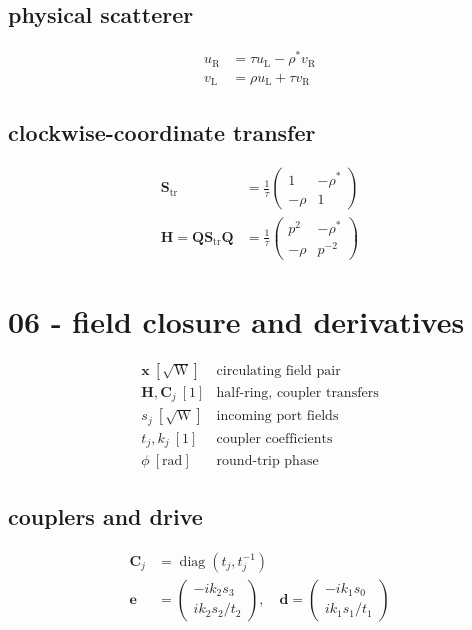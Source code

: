 \subsection*{physical scatterer}
\[
\displaystyle \begin{aligned}u_{\mathrm R}&=\tau u_{\mathrm L}-\rho^*v_{\mathrm R}\\v_{\mathrm L}&=\rho u_{\mathrm L}+\tau v_{\mathrm R}\end{aligned}
\]

\subsection*{clockwise-coordinate transfer}
\[
\displaystyle \begin{aligned}\mathbf S_{\mathrm{tr}}&=\frac1\tau\begin{pmatrix}1&-\rho^*\\-\rho&1\end{pmatrix}\\\mathbf H=\mathbf Q\mathbf S_{\mathrm{tr}}\mathbf Q&=\frac1\tau\begin{pmatrix}p^2&-\rho^*\\-\rho&p^{-2}\end{pmatrix}\end{aligned}
\]

\clearpage
\section*{06 - field closure and derivatives}

\[
\begin{array}{ll}\mathbf x\ [\sqrt{\mathrm W}]&\text{circulating field pair}\\[0.6em]\mathbf H,\mathbf C_j\ [1]&\text{half-ring, coupler transfers}\\[0.6em]s_j\ [\sqrt{\mathrm W}]&\text{incoming port fields}\\[0.6em]t_j,k_j\ [1]&\text{coupler coefficients}\\[0.6em]\phi\ [\mathrm{rad}]&\text{round-trip phase}\end{array}
\]

\subsection*{couplers and drive}
\[
\displaystyle \begin{aligned}\mathbf C_j&=\operatorname{diag}(t_j,t_j^{-1})\\\mathbf e&=\begin{pmatrix}-ik_2s_3\\ik_2s_2/t_2\end{pmatrix},\quad\mathbf d=\begin{pmatrix}-ik_1s_0\\ik_1s_1/t_1\end{pmatrix}\end{aligned}
\]

